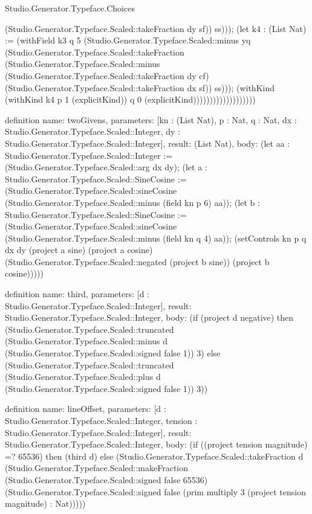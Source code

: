 \begin{lexlean}{Studio.Generator.Typeface.Choices}
\begin{semanticmodule}
{(Studio.Generator.Typeface.Scaled::takeFraction dy sf)) ss))); (let k4 : (List Nat) := (withField k3 q 5 (Studio.Generator.Typeface.Scaled::minus yq (Studio.Generator.Typeface.Scaled::takeFraction (Studio.Generator.Typeface.Scaled::minus (Studio.Generator.Typeface.Scaled::takeFraction dy cf) (Studio.Generator.Typeface.Scaled::takeFraction dx sf)) ss))); (withKind (withKind k4 p 1 (explicitKind)) q 0 (explicitKind)))))))))))))))))))
}

definition{
  name: twoGivens,
  parameters: [kn : (List Nat), p : Nat, q : Nat, dx : Studio.Generator.Typeface.Scaled::Integer, dy : Studio.Generator.Typeface.Scaled::Integer],
  result: (List Nat),
  body: (let aa : Studio.Generator.Typeface.Scaled::Integer := (Studio.Generator.Typeface.Scaled::arg dx dy); (let a : Studio.Generator.Typeface.Scaled::SineCosine := (Studio.Generator.Typeface.Scaled::sineCosine (Studio.Generator.Typeface.Scaled::minus (field kn p 6) aa)); (let b : Studio.Generator.Typeface.Scaled::SineCosine := (Studio.Generator.Typeface.Scaled::sineCosine (Studio.Generator.Typeface.Scaled::minus (field kn q 4) aa)); (setControls kn p q dx dy (project a sine) (project a cosine) (Studio.Generator.Typeface.Scaled::negated (project b sine)) (project b cosine)))))
}

definition{
  name: third,
  parameters: [d : Studio.Generator.Typeface.Scaled::Integer],
  result: Studio.Generator.Typeface.Scaled::Integer,
  body: (if (project d negative) then (Studio.Generator.Typeface.Scaled::truncated (Studio.Generator.Typeface.Scaled::minus d (Studio.Generator.Typeface.Scaled::signed false 1)) 3) else (Studio.Generator.Typeface.Scaled::truncated (Studio.Generator.Typeface.Scaled::plus d (Studio.Generator.Typeface.Scaled::signed false 1)) 3))
}

definition{
  name: lineOffset,
  parameters: [d : Studio.Generator.Typeface.Scaled::Integer, tension : Studio.Generator.Typeface.Scaled::Integer],
  result: Studio.Generator.Typeface.Scaled::Integer,
  body: (if ((project tension magnitude) =? 65536) then (third d) else (Studio.Generator.Typeface.Scaled::takeFraction d (Studio.Generator.Typeface.Scaled::makeFraction (Studio.Generator.Typeface.Scaled::signed false 65536) (Studio.Generator.Typeface.Scaled::signed false (prim multiply 3 (project tension magnitude) : Nat)))))
}


\end{semanticmodule}
\end{lexlean}
